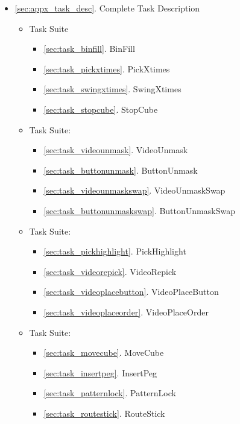 \begin{itemize}
\item \ref{sec:appx_task_desc}. Complete Task Description
  \begin{itemize}
      \item Task Suite \TSone
        \begin{itemize}
          \item \ref{sec:task_binfill}. BinFill
          \item \ref{sec:task_pickxtimes}. PickXtimes
          \item \ref{sec:task_swingxtimes}. SwingXtimes
          \item \ref{sec:task_stopcube}. StopCube
      \end{itemize}
      \item Task Suite: \TStwo
        \begin{itemize}
              \item \ref{sec:task_videounmask}. VideoUnmask
              \item \ref{sec:task_buttonunmask}. ButtonUnmask
              \item \ref{sec:task_videounmaskswap}. VideoUnmaskSwap
              \item \ref{sec:task_buttonunmaskswap}. ButtonUnmaskSwap
        \end{itemize}
    \item Task Suite: \TSthree
        \begin{itemize}
         \item \ref{sec:task_pickhighlight}. PickHighlight
          \item \ref{sec:task_videorepick}. VideoRepick
          \item \ref{sec:task_videoplacebutton}. VideoPlaceButton
         \item \ref{sec:task_videoplaceorder}. VideoPlaceOrder
    \end{itemize}
    \item Task Suite: \TSfour
        \begin{itemize}
             \item \ref{sec:task_movecube}. MoveCube
              \item \ref{sec:task_insertpeg}. InsertPeg
              \item \ref{sec:task_patternlock}. PatternLock
              \item \ref{sec:task_routestick}. RouteStick
        \end{itemize}

    \end{itemize}
\end{itemize}



\newpage


\newpage


\newpage


\newpage


\newpage
